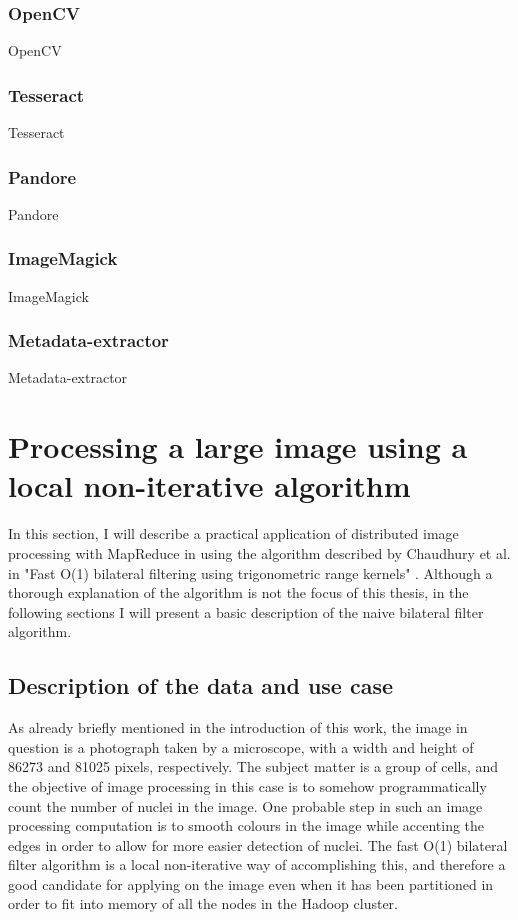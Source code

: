 \documentclass [12pt,a4paper]{report}
\begin{document}
\subsubsection{OpenCV}

OpenCV \cite{opencv}

\subsubsection{Tesseract}

Tesseract \cite{tesseract}

\subsubsection{Pandore}

Pandore \cite{pandore}

\subsubsection{ImageMagick}

ImageMagick \cite{imagemagick}

\subsubsection{Metadata-extractor}

Metadata-extractor \cite{metadataextractor}


\section{Processing a large image using a local non-iterative algorithm}

In this section, I will describe a practical application of distributed image processing with MapReduce in using the algorithm described by Chaudhury et al. in "Fast O(1) bilateral filtering using trigonometric range kernels" \cite{chaudhury2011fast}. Although a thorough explanation of the algorithm is not the focus of this thesis, in the following sections I will present a basic description of the naive bilateral filter algorithm.

\subsection{Description of the data and use case}

As already briefly mentioned in the introduction of this work, the image in question is a photograph taken by a microscope, with a width and height of 86273 and 81025 pixels, respectively. The subject matter is a group of cells, and the objective of image processing in this case is to somehow programmatically count the number of nuclei in the image. One probable step in such an image processing computation is to smooth colours in the image while accenting the edges in order to allow for more easier detection of nuclei. The fast O(1) bilateral filter algorithm is a local non-iterative way of accomplishing this, and therefore a good candidate for applying on the image even when it has been partitioned in order to fit into memory of all the nodes in the Hadoop cluster.
\end{document}
